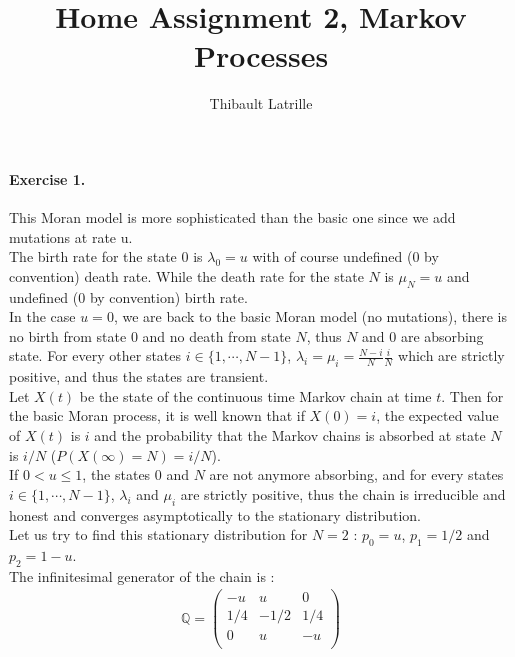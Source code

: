 \documentclass{article}
\author{Thibault Latrille}
\title{Home Assignment 2, Markov Processes}
\begin{document}
\maketitle
\paragraph{Exercise 1.\\}

This Moran model is more sophisticated than the basic one since we add mutations at rate u. \\

The birth rate for the state $0$ is $\lambda_0=u$ with of course undefined ($0$ by convention) death rate. While the death rate for the state $N$ is  $\mu_N=u$ and undefined ($0$ by convention) birth rate. \\

In the case $u=0$, we are back to the basic Moran model (no mutations), there is no birth from state $0$ and no death from state $N$, thus $N$ and $0$ are absorbing state. For every other states $i \in \{1,\cdots ,N-1 \}$, $\lambda_i=\mu_i=\frac{N-i}{N} \frac{i}{N}$ which are strictly positive, and thus the states are transient.  \\


Let $X(t)$ be the state of the continuous time Markov chain at time $t$. Then for the basic Moran process, it is well known that if $X(0)=i$, the expected value of $X(t)$ is $i$ and the probability that the Markov chains is absorbed at state $N$ is $i/N$ ($P(X(\infty)=N)=i/N$).\\

If $0<u \leq 1$, the states $0$ and $N$ are not anymore absorbing, and for every states $i \in \{1,\cdots ,N-1 \}$, $\lambda_i$ and $\mu_i$ are strictly positive, thus the chain is irreducible and honest and converges asymptotically to the stationary distribution.
\\

Let us try to find this stationary distribution for $N=2$ : $p_0=u$, $p_1=1/2$ and $p_2=1-u$.\\

The infinitesimal generator of the chain is : 
\begin{align*}
\mathbb{Q}=
\begin{pmatrix}
-u & u & 0  \\
1/4 & -1/2 & 1/4 \\
0 & u & -u   \\
\end{pmatrix}
\end{align*}
\end{document}
